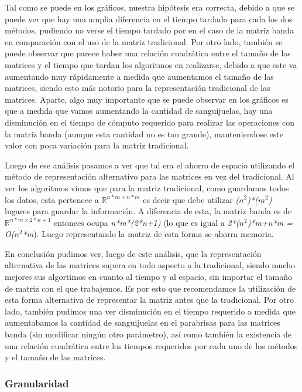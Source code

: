 \documentclass[10pt, a4paper]{article}
\begin{document}
Tal como se puede en los gr\'aficos, nuestra hip\'otesis era correcta, debido a que se puede ver que hay una amplia diferencia en el tiempo tardado para cada los dos m\'etodos, pudiendo no verse el tiempo tardado por en el caso de la matriz banda en comparaci\'on con el uso de la matriz tradicional. Por otro lado, tambi\'en se puede observar que parece haber una relaci\'on cuadr\'atica entre el tamaño de las matrices y el tiempo que tardan los algoritmos en realizarse, debido a que este va aumentando muy r\'apidamente a medida que aumentamos el tamaño de las matrices, siendo esto m\'as notorio para la representaci\'on tradicional de las matrices. Aparte, algo muy importante que se puede observar en los gr\'aficos es que a medida que vamos aumentando la cantidad de sanguijuelas, hay una disminuci\'on en el tiempo de c\'omputo requerido para realizar las operaciones con la matriz banda (aunque esta cantidad no es tan grande), manteniendose este valor con poca variaci\'on para la matriz tradicional.

Luego de ese an\'alisis pasamos a ver que tal era el ahorro de espacio utilizando el m\'etodo de representaci\'on alternativo para las matrices en vez del tradicional. Al ver los algoritmos vimos que para la matriz tradicional, como guardamos todos los datos, esta pertenece a $\mathbb{R}^{n*m \times n*m}$ es decir que debe utilizar \textit{($n^{2}$)*($m^{2}$)} lugares para guardar la informaci\'on. A diferencia de esta, la matriz banda es de $\mathbb{R}^{n*m \times 2*n+1}$ entonces ocupa \textit{n*m*(2*n+1)} (lo que es igual a \textit{2*($n^{2}$)*m+n*m = O($n^2$*m}). Luego representando la matriz de esta forma se ahorra memoria.

En conclusi\'on pudimos ver, luego de este an\'alisis, que la representaci\'on alternativa de las matrices supera en todo aspecto a la tradicional, siendo mucho mejores sus algortimos en cuanto al tiempo y al espacio, sin importar el tamaño de matriz con el que trabajemos. Es por esto que recomendamos la utilizaci\'on de esta forma alternativa de representar la matriz antes que la tradicional. Por otro lado, tambi\'en pudimos una ver disminuci\'on en el tiempo requerido a medida que aumentabamos la cantidad de sanguijuelas en el parabrisas para las matrices banda (sin modificar ning\'un otro par\'ametro), as\'i como tambi\'en la existencia de una relaci\'on cuadr\'atica entre los tiempos requeridos por cada uno de los m\'etodos y el tamaño de las matrices.

\subsubsection{Granularidad}
\end{document}
